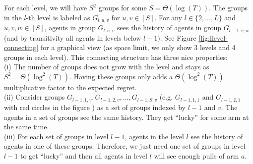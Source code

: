 For each level, we will have $S^2$ groups for some $S = \Theta(\log(T))$. The groups in the $l$-th level is labeled as $G_{l,u,v}$ for $u,v\in[S]$. For any $l \in \{2,...,L\}$ and $u,v,w\in [S]$, agents in group $G_{l,u,v}$ sees the history of agents in group $G_{l-1,v,w}$ (and by transitivity all agents in levels below $l-1$). See Figure \ref{fig:llevel-connecting} for a graphical view (as space limit, we only show 3 levels and 4 groups in each level). This connecting structure has three nice properties: \\
(i) The number of groups does not grow with the level and stays as $S^2 = \Theta(\log^2(T))$.  Having these groups only adds a $\Theta(\log^2(T))$ multiplicative factor to the expected regret.\\
(ii) Consider groups $G_{l-1,1,v},G_{l-1,2,v},...,G_{l-1,S,v}$ (e.g. $G_{l-1,1,1}$ and $G_{l-1,2,1}$ with red circles in the figure ) as a set of groups indexed by $l-1$ and $v$. The agents in a set of groups see the same history. They get ``lucky'' for some arm at the same time.\\
(iii) For each set of groups in level $l-1$, agents in the level $l$ see the history of agents in one of these groups. Therefore, we just need one set of groups in level $l-1$ to get ``lucky'' and then all agents in level $l$ will see enough pulls of arm $a$. 

